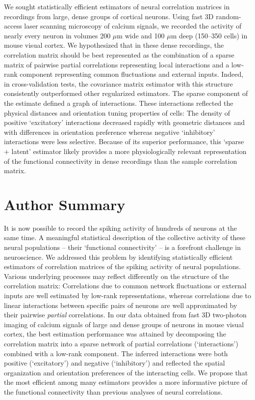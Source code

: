 \documentclass[10pt]{article}
\newcommand{\sq}[1]{\lq#1\rq}
\begin{document}
We sought statistically efficient estimators of neural correlation matrices in recordings from large, dense groups of cortical neurons.  Using fast 3D random-access laser scanning microscopy of calcium signals, we recorded the activity of nearly every neuron in volumes 200 $\mu$m wide and 100 $\mu$m deep (150--350 cells) in mouse visual cortex.  We hypothesized that in these dense recordings, the correlation matrix should be best represented as the combination of a sparse matrix of pairwise partial correlations representing local interactions and a low-rank component representing common fluctuations and external inputs.  Indeed, in cross-validation tests, the covariance matrix estimator with this structure consistently outperformed other regularized estimators. The sparse component of the estimate defined a graph of interactions. These interactions reflected the physical distances and orientation tuning properties of cells: The density of positive \sq{excitatory} interactions decreased rapidly with geometric distances and with differences in orientation preference whereas negative \sq{inhibitory} interactions were less selective.  Because of its superior performance, this \sq{sparse + latent} estimator likely provides a more physiologically relevant representation of the functional connectivity in dense recordings than the sample correlation matrix.

\section*{Author Summary}

It is now possible to record the spiking activity of hundreds of neurons at the same time.  A meaningful statistical description of the collective activity of these neural populations -- their \sq{functional connectivity} -- is a forefront challenge in neuroscience.  We addressed this problem by identifying statistically efficient estimators of correlation matrices of the spiking activity of neural populations.  Various underlying processes may reflect differently on the structure of the correlation matrix:  Correlations due to common network fluctuations or external inputs are well estimated by low-rank representations, whereas correlations due to linear interactions between specific pairs of neurons are well approximated by their pairwise \emph{partial} correlations.  In our data obtained from fast 3D two-photon imaging of calcium signals of large and dense groups of neurons in mouse visual cortex, the best estimation performance was attained by decomposing the correlation matrix into a sparse network of partial correlations (\sq{interactions}) combined with a low-rank component. The inferred interactions were both positive (\sq{excitatory}) and negative (\sq{inhibitory}) and reflected the spatial organization and orientation preferences of the interacting cells.  We propose that  the most efficient among many estimators provides a more informative picture of the functional connectivity than previous analyses of neural correlations.
\end{document}
